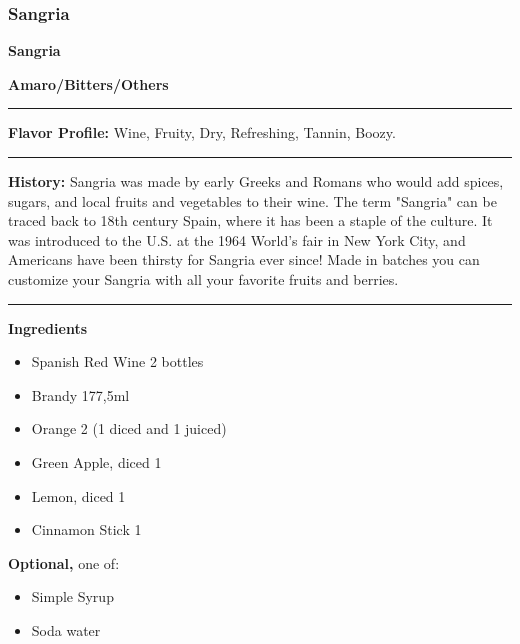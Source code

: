 \subsubsection{Sangria}
\noindent
\begin{minipage}{.48\textwidth}
    \noindent\textbf{\LARGE Sangria}
\end{minipage}
\hspace{.02\textwidth}
\begin{minipage}{.48\textwidth}
    \raggedleft
    \textbf{\large Amaro/Bitters/Others}\\
\end{minipage}
\vspace{.5em}\hrule\vspace{.5em}
\noindent
\textbf{\large Flavor Profile:} Wine, Fruity, Dry, Refreshing, Tannin, Boozy.
\vspace{.5em}\hrule\vspace{.5em}
\noindent
\textbf{\large History:} Sangria was made by early Greeks and Romans who would add spices, sugars, and local fruits and vegetables to their wine. The term "Sangria" can be traced back to 18th century Spain, where it has been a staple of the culture. It was introduced to the U.S. at the 1964 World's fair in New York City, and Americans have been thirsty for Sangria ever since! Made in batches you can customize your Sangria with all your favorite fruits and berries.
\vspace{.5em}\hrule\vspace{.5em}
\noindent
\begin{minipage}[t]{.48\textwidth}
    \noindent
    \textbf{\large Ingredients}
    \begin{itemize}
        \item Spanish Red Wine 2 bottles
        \item Brandy 177,5ml
        \item Orange 2 (1 diced and 1 juiced)
        \item Green Apple, diced 1
        \item Lemon, diced 1
        \item Cinnamon Stick 1
    \end{itemize}
    \noindent
    \textbf{\large Optional,} one of:
    \begin{itemize}
        \item Simple Syrup
        \item Soda water
    \end{itemize}
\end{minipage}
